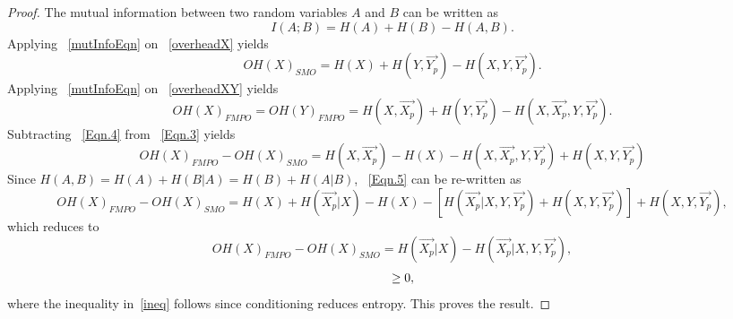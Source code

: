 \documentclass[12pt,epsf]{article}
\theoremstyle{definition}
\begin{document}
\begin{proof}
The mutual information between two random variables $A$ and $B$ can be written as
\begin{equation} 
I(A;B)=H(A) + H(B) - H(A,B).
\label{mutInfoEqn}
\end{equation}
Applying ~\eqref{mutInfoEqn} on ~\eqref{overheadX} yields
\begin{equation}
OH(X)_{SMO}= H(X)+H(Y,\vec{Y_p})-H(X,Y,\vec{Y_p}).
\label{Eqn.4}
\end{equation}
Applying ~\eqref{mutInfoEqn} on ~\eqref{overheadXY} yields
\begin{equation}
OH(X)_{FMPO}=OH(Y)_{FMPO}= H(X,\vec{X_p})+H(Y,\vec{Y_p})-H(X,\vec{X_p},Y,\vec{Y_p}).
\label{Eqn.3}
\end{equation}
Subtracting ~\eqref{Eqn.4} from ~\eqref{Eqn.3} yields 
\begin{equation}
OH(X)_{FMPO}-OH(X)_{SMO}=H(X,\vec{X_p})-H(X)-H(X,\vec{X_p},Y,\vec{Y_p})+H(X,Y,\vec{Y_p})
\label{Eqn.5}
\end{equation}
Since $H(A,B) = H(A) + H(B|A) = H(B) + H(A|B) $, ~\eqref{Eqn.5} can be re-written as
\begin{equation}
OH(X)_{FMPO}-OH(X)_{SMO}=H(X)+H(\vec{X_p}|X)-H(X)-[H(\vec{X_p}|X,Y,\vec{Y_p})+H(X,Y,\vec{Y_p})] + H(X,Y,\vec{Y_p}),
\nonumber
\end{equation}
which reduces to 
\vspace{-0.5 cm}
\begin{equation}
OH(X)_{FMPO}-OH(X)_{SMO}=H(\vec{X_p}|X)- H(\vec{X_p}|X,Y,\vec{Y_p}),
\label{lasteqn}
\end{equation}
\begin{equation}
\hspace*{0.6 cm} \ge 0,
\label{ineq}
\end{equation}
where the inequality in~\eqref{ineq} follows since conditioning reduces entropy. This proves the result.
\end{proof}
%
\end{document}

